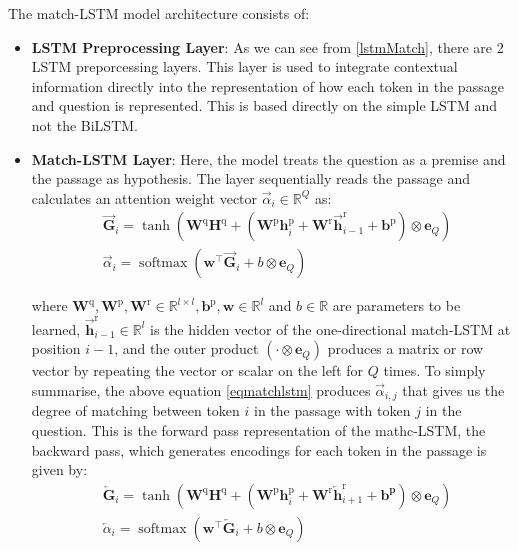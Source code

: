 \documentclass[a4paper,12pt]{report}
\begin{document}
             The match-LSTM model architecture consists of:
             \begin{itemize}
             	\item \textbf{LSTM Preprocessing Layer}: As we can see from \ref{lstmMatch}, there are 2 LSTM preporcessing layers. This layer is used to integrate contextual information directly into the representation of how each token in the passage and question is represented. This is based directly on the simple LSTM \citep{lstmoriginal} and not the BiLSTM.
             	\item \textbf{Match-LSTM Layer}: Here, the model treats the question as a premise and the passage as hypothesis. The layer sequentially reads the passage and calculates an attention weight vector $ \vec{\alpha}_{i} \in \mathbb{R}^{Q}$ as:
             	\begin{equation}\label{eqmatchlstm}
             		\begin{aligned}
             			&\overrightarrow{\mathbf{G}}_{i}=\tanh \left(\mathbf{W}^{\mathrm{q}} \mathbf{H}^{\mathrm{q}}+\left(\mathbf{W}^{\mathrm{p}} \mathbf{h}_{i}^{\mathrm{p}}+\mathbf{W}^{\mathrm{r}} \overrightarrow{\mathbf{h}}_{i-1}^{\mathrm{r}}+\mathbf{b}^{\mathrm{p}}\right) \otimes \mathbf{e}_{Q}\right) \\
             			&\vec{\alpha}_{i}=\operatorname{softmax}\left(\mathbf{w}^{\top} \overrightarrow{\mathbf{G}}_{i}+b \otimes \mathbf{e}_{Q}\right)
             		\end{aligned}
             	\end{equation}

			where $\mathbf{W}^{\mathrm{q}}, \mathbf{W}^{\mathrm{p}}, \mathbf{W}^{\mathrm{r}} \in \mathbb{R}^{l \times l}, \mathbf{b}^{\mathrm{p}}, \mathbf{w} \in \mathbb{R}^{l}$ and $b \in \mathbb{R}$ are parameters to be learned, $\overrightarrow{\mathbf{h}}_{i-1}^{\mathrm{r}} \in \mathbb{R}^{l}$ is the hidden vector of the one-directional match-LSTM at position $i-1$, and the outer product $\left(\cdot \otimes \mathbf{e}_{Q}\right)$ produces a matrix or row vector by repeating the vector or scalar on the left for $Q$ times.
			To simply summarise, the above equation \ref{eqmatchlstm} produces  $ \vec{\alpha}_{i,j} $ that gives us the degree of matching between token $ i $ in the passage with token $ j $ in the question. This is the forward pass representation of the mathc-LSTM, the backward pass, which generates encodings for each token in the passage is given by:
			\begin{equation}\label{eqmatchlstmreverse}
				\begin{aligned}
					&\overleftarrow{\mathbf{G}}_{i}=\tanh \left(\mathbf{W}^{\mathrm{q}} \mathbf{H}^{\mathrm{q}}+\left(\mathbf{W}^{\mathrm{p}} \mathbf{h}_{i}^{\mathrm{p}}+\mathbf{W}^{\mathrm{r}} \overleftarrow{\mathbf{h}}_{i+1}^{\mathrm{r}}+\mathbf{b}^{\mathbf{p}}\right) \otimes \mathbf{e}_{Q}\right) \\
					&\overleftarrow{\alpha}_{i}=\operatorname{softmax}\left(\mathbf{w}^{\top} \overleftarrow{\mathbf{G}}_{i}+b \otimes \mathbf{e}_{Q}\right)
				\end{aligned}
			\end{equation}


\end{itemize}
\end{document}
